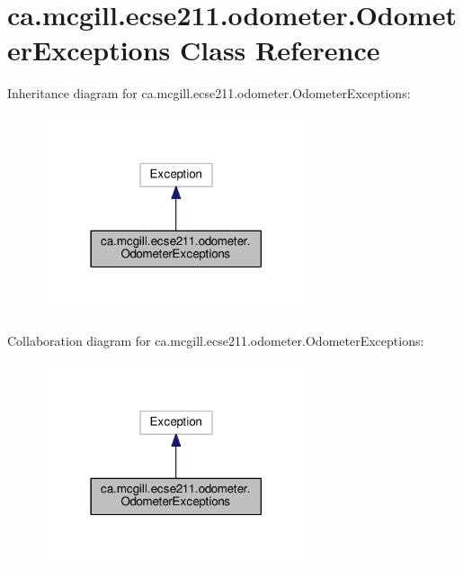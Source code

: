 \hypertarget{classca_1_1mcgill_1_1ecse211_1_1odometer_1_1_odometer_exceptions}{}\section{ca.\+mcgill.\+ecse211.\+odometer.\+Odometer\+Exceptions Class Reference}
\label{classca_1_1mcgill_1_1ecse211_1_1odometer_1_1_odometer_exceptions}


Inheritance diagram for ca.\+mcgill.\+ecse211.\+odometer.\+Odometer\+Exceptions\+:\nopagebreak
\begin{figure}[H]
\begin{center}
\leavevmode
\includegraphics[width=222pt]{classca_1_1mcgill_1_1ecse211_1_1odometer_1_1_odometer_exceptions__inherit__graph}
\end{center}
\end{figure}


Collaboration diagram for ca.\+mcgill.\+ecse211.\+odometer.\+Odometer\+Exceptions\+:\nopagebreak
\begin{figure}[H]
\begin{center}
\leavevmode
\includegraphics[width=222pt]{classca_1_1mcgill_1_1ecse211_1_1odometer_1_1_odometer_exceptions__coll__graph}
\end{center}
\end{figure}
